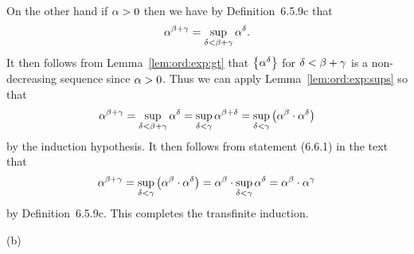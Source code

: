 {{    On the other hand if $\alpha > 0$ then we have by Definition~6.5.9c that
    $$
      \alpha^{\beta+\gamma} = \sup_{\delta < \beta+\gamma} \alpha^\delta.
    $$
    It then follows from Lemma~\ref{lem:ord:exp:gt} that $\left\{ \alpha^\delta \right\}$ for $\delta < \beta + \gamma$ is a non-decreasing sequence since $\alpha > 0$.
    Thus we can apply Lemma~\ref{lem:ord:exp:sups} so that
    $$
      \alpha^{\beta+\gamma} = \sup_{\delta < \beta+\gamma} \alpha^\delta = \sup_{\delta < \gamma} \alpha^{\beta + \delta} = \sup_{\delta < \gamma} \left( \alpha^\beta \cdot \alpha^\delta \right)
    $$
    by the induction hypothesis.
    It then follows from statement (6.6.1) in the text that
    $$
      \alpha^{\beta+\gamma} = \sup_{\delta < \gamma} \left( \alpha^\beta \cdot \alpha^\delta \right) = \alpha^\beta \cdot \sup_{\delta < \gamma} \alpha^\delta = \alpha^\beta \cdot \alpha^\gamma
    $$
    by Definition~6.5.9c.
    This completes the transfinite induction.
  }

  (b)
  }
